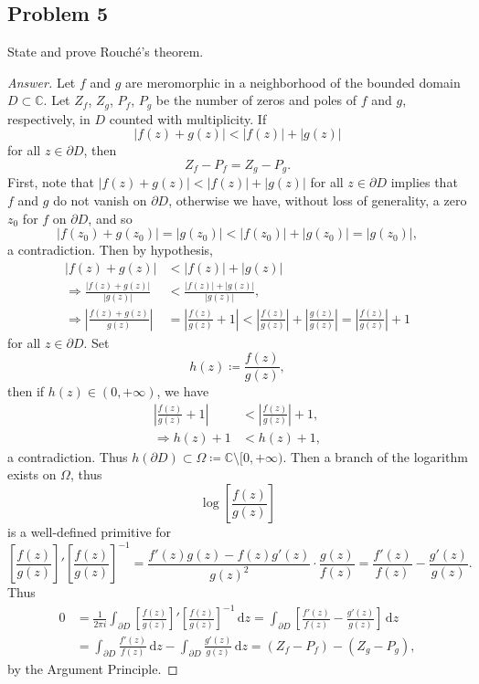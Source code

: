 \documentclass[12pt]{article}
\newcommand{\cx}{\mathbb{C}}
\newcommand\paren[1]{\left( #1 \right)}
\newcommand{\sqbrack}[1]{\left [ #1 \right ]}
\newcommand{\abs}[1]{\left| #1 \right|}
\renewcommand{\i}[4]{\int_{#1}^{#2} {#3} \, \mathrm{d} {#4} }
\theoremstyle{definition}
\begin{document}
\subsection{Problem 5 \texorpdfstring{\cite{Conway}}{}}
State and prove Rouch\'e's theorem. 
\begin{proof}[Answer]
    Let $f$ and $g$ are meromorphic in a neighborhood of the bounded domain $D \subset \cx$. Let $Z_f$, $Z_g$, $P_f$, $P_g$ be the number of zeros and poles of $f$ and $g$, respectively, in $D$ counted with multiplicity. If   
    \[
        \abs{ f(z) + g(z) } < \abs{ f(z) } + \abs{ g(z) }
    \]
    for all $z \in \partial D$, then 
    \[
        Z_f - P_f = Z_g - P_g . 
    \]
    First, note that $\abs{ f(z) + g(z) } < \abs{ f(z) } + \abs{ g(z) }$ for all $z \in \partial D$ implies that $f$ and $g$ do not vanish on $\partial D$, otherwise we have, without loss of generality, a zero $z_0$ for $f$ on $\partial D$, and so 
    \[
        \abs{ f \paren{ z_0 } + g \paren{ z_0 } } = \abs{ g \paren{ z_0 } } < \abs{ f \paren{ z_0 } } + \abs{ g \paren{ z_0 } } = \abs{ g \paren{ z_0 } } , 
    \]
    a contradiction. Then by hypothesis, 
    \begin{align*}
        \abs{ f(z) + g(z) } & < \abs{ f(z) } + \abs{ g(z) } \\ 
        \Rightarrow \frac{ \abs{ f(z) + g(z) } }{ \abs{ g(z) } } & < \frac{ \abs{ f(z) } + \abs{ g(z) } }{ \abs{ g(z) } } , \\ 
        \Rightarrow \abs{ \frac{f(z) + g(z)}{g(z)} } & = \abs{ \frac{f(z)}{g(z)} + 1 } < \abs{ \frac{f(z)}{g(z)} } + \abs{ \frac{g(z)}{g(z)} } = \abs{ \frac{f(z)}{g(z)} } + 1 
    \end{align*}
    for all $z \in \partial D$. Set 
    \[
        h(z) \coloneqq \frac{f(z)}{g(z)} , 
    \]
    then if $h(z) \in (0,+\infty)$, we have 
    \begin{align*}
        \abs{ \frac{f(z)}{g(z)} + 1 } & < \abs{ \frac{f(z)}{g(z)} } + 1 , \\ 
        \Rightarrow h(z) + 1 & < h(z) + 1 , 
    \end{align*}
    a contradiction. Thus $h \paren{ \partial D } \subset \Omega \coloneqq \cx \setminus [0,+\infty)$. Then a branch of the logarithm exists on $\Omega$, thus 
    \[
        \log \sqbrack{ \frac{f(z)}{g(z)} }
    \]
    is a well-defined primitive for 
    \[
        \sqbrack{ \frac{f(z)}{g(z)} }' \sqbrack{ \frac{f(z)}{g(z)} }^{-1} = \frac{f'(z)g(z) - f(z)g'(z)}{g(z)^2} \cdot \frac{g(z)}{f(z)} = \frac{f'(z)}{f(z)} - \frac{g'(z)}{g(z)} . 
    \]
    Thus 
    \begin{align*}
        0 & = \frac{1}{2\pi i} \i{\partial D}{}{ \sqbrack{ \frac{f(z)}{g(z)} }' \sqbrack{ \frac{f(z)}{g(z)} }^{-1} }{z} = \i{\partial D}{}{ \sqbrack{ \frac{f'(z)}{f(z)} - \frac{g'(z)}{g(z)} } }{z} \\ 
        & = \i{\partial D}{}{ \frac{f'(z)}{f(z)} }{z} - \i{\partial D}{}{ \frac{g'(z)}{g(z)} }{z} = \paren{ Z_f - P_f } - \paren{ Z_g - P_g } , 
    \end{align*}
    by the Argument Principle. 
\end{proof}
\end{document}
